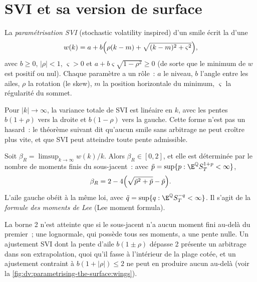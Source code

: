 \section{SVI et sa version de surface}

\begin{definition}\label{def:dv:parametrising-the-surface:svi}
La \emph{paramétrisation SVI} (stochastic volatility
inspired) d'un smile écrit la  d'une
\[
w(k)=a+b\Bigl(\rho(k-m)+\sqrt{(k-m)^2+\varsigma^2}\Bigr),
\]
avec $b\ge0$, $|\rho|<1$, $\varsigma>0$ et $a+b\varsigma\sqrt{1-\rho^2}\ge0$ (de sorte que le
minimum de $w$ est positif ou nul). Chaque paramètre a un rôle~: $a$ le niveau, $b$
l'angle entre les ailes, $\rho$ la rotation (le skew), $m$ la position horizontale du
minimum, $\varsigma$ la régularité du sommet.
\end{definition}

Pour $|k|\to\infty$, la variance totale de SVI est linéaire en $k$, avec les pentes $b(1+\rho)$ vers
la droite et $b(1-\rho)$ vers la gauche. Cette forme n'est pas un hasard~: le théorème suivant dit
qu'aucun smile sans arbitrage ne peut croître plus vite, et que SVI peut atteindre toute pente admissible.

\begin{theorem}\label{thm:dv:parametrising-the-surface:lee}
Soit $\beta_R=\limsup_{k\to\infty}w(k)/k$. Alors $\beta_R\in[0,2]$, et elle est déterminée par le
nombre de moments finis du sous-jacent~: avec $\tilde p=\sup\{p:\E^{\mathbb Q}S_T^{1+p}<\infty\}$,
\[
\beta_R=2-4\Bigl(\sqrt{\tilde p^2+\tilde p}-\tilde p\Bigr).
\]
L'aile gauche obéit à la même loi, avec $\tilde q=\sup\{q:\E^{\mathbb Q}S_T^{-q}<\infty\}$. Il s'agit de la
\emph{formule des moments de Lee} (Lee moment formula).
\end{theorem}
\admitted

La borne 2 n'est atteinte que si le sous-jacent n'a aucun moment fini au-delà du premier~; une
lognormale, qui possède tous ses moments, a une pente nulle. Un ajustement SVI dont la pente d'aile $b(1\pm\rho)$ dépasse
2 présente un arbitrage dans son extrapolation, quoi qu'il fasse à l'intérieur de la plage cotée, et un ajustement
contraint à $b(1+|\rho|)\le2$ ne peut en produire aucun au-delà
(voir la \cref{fig:dv:parametrising-the-surface:wings}).

